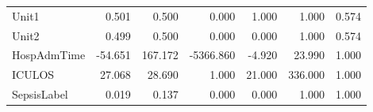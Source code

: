 \begin{table}
\begin{tabular}{lrrrrrr}
Unit1            &   0.501 &              0.500 &     0.000 &   1.000 &    1.000 &           0.574 \\
Unit2            &   0.499 &              0.500 &     0.000 &   0.000 &    1.000 &           0.574 \\
HospAdmTime      & -54.651 &            167.172 & -5366.860 &  -4.920 &   23.990 &           1.000 \\
ICULOS           &  27.068 &             28.690 &     1.000 &  21.000 &  336.000 &           1.000 \\
SepsisLabel      &   0.019 &              0.137 &     0.000 &   0.000 &    1.000 &           1.000 \\
\bottomrule
\end{tabular}
\end{table}
